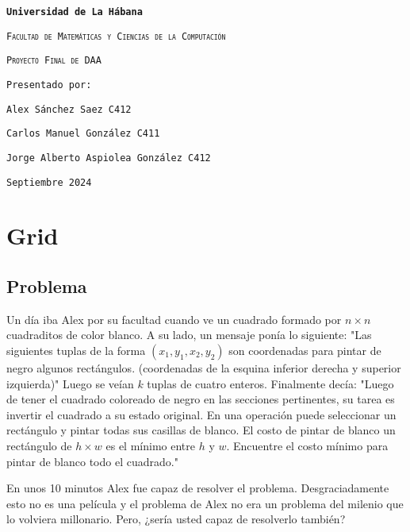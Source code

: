 \documentclass{article}
\begin{document}
    \sloppypar
    \begin{titlepage}
        \centering
        {\bfseries\LARGE\texttt{Universidad de La Hábana} \par}
        \vspace{1cm}
        {\scshape\Large\texttt{Facultad de Matemáticas y Ciencias de la Computación} \par}
        \vfill
        {\scshape\Huge\texttt{Proyecto Final de DAA } \par}
        \vspace{1cm}
        {\scshape\LARGE\texttt{} \par}
        \vfill
        {\LARGE\texttt{Presentado por:} \par}
        \vspace{0.5cm}
        {\Large\texttt{Alex Sánchez Saez C412} \par}
        {\Large\texttt{Carlos Manuel González C411} \par}
        {\Large\texttt{Jorge Alberto Aspiolea González C412} \par}
        \vfill
        {\Large\texttt{Septiembre 2024} \par}
    \end{titlepage}
	\tableofcontents
	\newpage
	\section{Grid}
	\subsection{Problema}
	Un día iba Alex por su facultad cuando ve un cuadrado formado por $n \times n$  
cuadraditos de color blanco. A su lado, un mensaje ponía lo siguiente: "Las  
siguientes tuplas de la forma $(x_1, y_1, x_2, y_2)$ son coordenadas para pintar de  
negro algunos rectángulos. (coordenadas de la esquina inferior derecha y superior  
izquierda)" Luego se veían $k$ tuplas de cuatro enteros. Finalmente decía:  
"Luego de tener el cuadrado coloreado de negro en las secciones pertinentes, su  
tarea es invertir el cuadrado a su estado original. En una operación puede seleccionar  
un rectángulo y pintar todas sus casillas de blanco. El costo de pintar  
de blanco un rectángulo de $h \times w$ es el mínimo entre $h$ y $w$. Encuentre el costo  
mínimo para pintar de blanco todo el cuadrado."

En unos 10 minutos Alex fue capaz de resolver el problema. Desgraciadamente  
esto no es una película y el problema de Alex no era un problema  
del milenio que lo volviera millonario. Pero, ¿sería usted capaz de resolverlo  
también?
	
\end{document}
